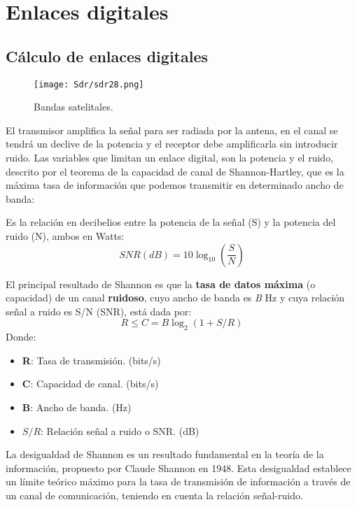 \documentclass[
	12pt, %
	fleqn, %
	a4paper, %
	oneside, %
]{LegrandOrangeBook}
\begin{document}
\chapter{Enlaces digitales}
\section{Cálculo de enlaces digitales}
\begin{figure}[H]
\centering
\texttt{[image: Sdr/sdr28.png]}
\caption{Bandas satelitales.}
\end{figure}
El transmisor amplifica la señal para ser radiada por la antena, en el canal se tendrá un declive de la potencia y el receptor debe amplificarla sin introducir ruido. Las variables que limitan un enlace digital, son la potencia y el ruido, descrito por el teorema de la capacidad de canal de Shannon-Hartley, que es la máxima tasa de información que podemos transmitir en determinado ancho de banda:
\begin{definition}
Es la relación en decibelios entre la potencia de la señal (S) y la potencia del ruido (N), ambos en Watts:
\begin{equation}
\label{eq:snr}
SNR(dB)=10\log_{10}\left(\frac{S}{N}\right)
\end{equation}
\end{definition}
\begin{definition}
El principal resultado de Shannon es que la \textbf{tasa de datos máxima} (o capacidad) de un canal \textbf{ruidoso}, cuyo ancho de banda es \textit{B} Hz y cuya relación señal a ruido es S/N (SNR), está dada por:
\begin{equation}
R\leq C=B\log_2(1+S/R)
\end{equation}
Donde:
\begin{itemize}
\item \textbf{R}: Tasa de transmisión. (bits/s)
\item \textbf{C}: Capacidad de canal. (bits/s)
\item \textbf{B}: Ancho de banda. (Hz)
\item $S/R$: Relación señal a ruido o SNR. (dB)
\end{itemize}
\end{definition}
La desigualdad de Shannon es un resultado fundamental en la teoría de la información, propuesto por Claude Shannon en 1948. Esta desigualdad establece un límite teórico máximo para la tasa de transmisión de información a través de un canal de comunicación, teniendo en cuenta la relación señal-ruido.\\
\end{document}
